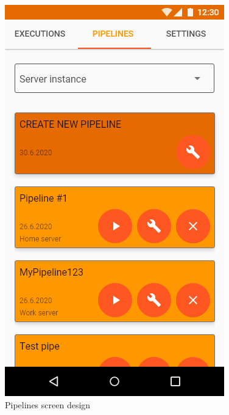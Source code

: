 \begin{figure}
\begin{minipage}[b]{0.32\textwidth}
    	\includegraphics[width=\textwidth]{pics/xd/Pipelines.png}
    	\caption[Pipelines]{Pipelines screen design}\label{fig:xdPipelines}
    \end{minipage}
    \begin{minipage}[b]{0.32\textwidth}

\end{minipage}
\end{figure}
